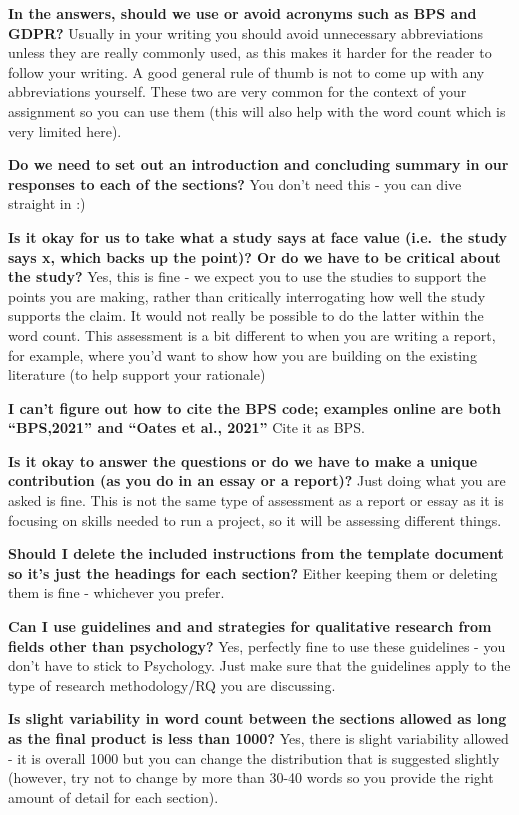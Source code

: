 \documentclass[
  english,
  letterpaper,
  DIV=11,
  numbers=noendperiod]{scrreprt}
\begin{document}
\textbf{In the answers, should we use or avoid acronyms such as BPS and
GDPR?} Usually in your writing you should avoid unnecessary
abbreviations unless they are really commonly used, as this makes it
harder for the reader to follow your writing. A good general rule of
thumb is not to come up with any abbreviations yourself. These two are
very common for the context of your assignment so you can use them (this
will also help with the word count which is very limited here).

\textbf{Do we need to set out an introduction and concluding summary in
our responses to each of the sections?} You don't need this - you can
dive straight in :)

\textbf{Is it okay for us to take what a study says at face value
(i.e.~the study says x, which backs up the point)? Or do we have to be
critical about the study?} Yes, this is fine - we expect you to use the
studies to support the points you are making, rather than critically
interrogating how well the study supports the claim. It would not really
be possible to do the latter within the word count. This assessment is a
bit different to when you are writing a report, for example, where you'd
want to show how you are building on the existing literature (to help
support your rationale)

\textbf{I can't figure out how to cite the BPS code; examples online are
both ``BPS,2021'' and ``Oates et al., 2021''} Cite it as BPS.

\textbf{Is it okay to answer the questions or do we have to make a
unique contribution (as you do in an essay or a report)?} Just doing
what you are asked is fine. This is not the same type of assessment as a
report or essay as it is focusing on skills needed to run a project, so
it will be assessing different things.

\textbf{Should I delete the included instructions from the template
document so it's just the headings for each section?} Either keeping
them or deleting them is fine - whichever you prefer.

\textbf{Can I use guidelines and and strategies for qualitative research
from fields other than psychology?} Yes, perfectly fine to use these
guidelines - you don't have to stick to Psychology. Just make sure that
the guidelines apply to the type of research methodology/RQ you are
discussing.

\textbf{Is slight variability in word count between the sections allowed
as long as the final product is less than 1000?} Yes, there is slight
variability allowed - it is overall 1000 but you can change the
distribution that is suggested slightly (however, try not to change by
more than 30-40 words so you provide the right amount of detail for each
section).
\end{document}
